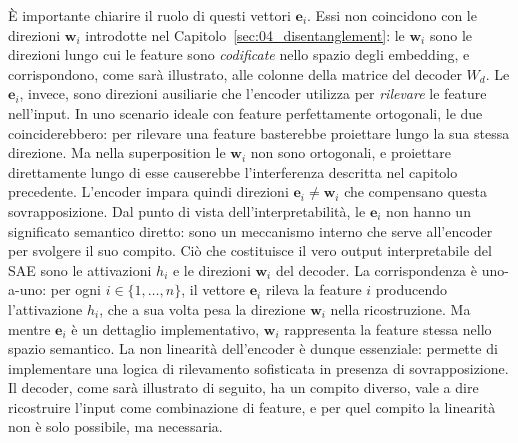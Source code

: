 È importante chiarire il ruolo di questi vettori $\mathbf{e}_i$. Essi non coincidono con le direzioni $\mathbf{w}_i$ introdotte nel Capitolo~\ref{sec:04_disentanglement}: le $\mathbf{w}_i$ sono le direzioni lungo cui le feature sono \textit{codificate} nello spazio degli embedding, e corrispondono, come sarà illustrato, alle colonne della matrice del decoder $W_d$. Le $\mathbf{e}_i$, invece, sono direzioni ausiliarie che l'encoder utilizza per \textit{rilevare} le feature nell'input. In uno scenario ideale con feature perfettamente ortogonali, le due coinciderebbero: per rilevare una feature basterebbe proiettare lungo la sua stessa direzione. Ma nella superposition le $\mathbf{w}_i$ non sono ortogonali, e proiettare direttamente lungo di esse causerebbe l'interferenza descritta nel capitolo precedente. L'encoder impara quindi direzioni $\mathbf{e}_i \neq \mathbf{w}_i$ che compensano questa sovrapposizione.
Dal punto di vista dell'interpretabilità, le $\mathbf{e}_i$ non hanno un significato semantico diretto: sono un meccanismo interno che serve all'encoder per svolgere il suo compito. Ciò che costituisce il vero output interpretabile del SAE sono le attivazioni $h_i$ e le direzioni $\mathbf{w}_i$ del decoder. La corrispondenza è uno-a-uno: per ogni $i \in \{1, \dots, n\}$, il vettore $\mathbf{e}_i$ rileva la feature $i$ producendo l'attivazione $h_i$, che a sua volta pesa la direzione $\mathbf{w}_i$ nella ricostruzione. Ma mentre $\mathbf{e}_i$ è un dettaglio implementativo, $\mathbf{w}_i$ rappresenta la feature stessa nello spazio semantico.
La non linearità dell'encoder è dunque essenziale: permette di implementare una logica di rilevamento sofisticata in presenza di sovrapposizione. Il decoder, come sarà illustrato di seguito, ha un compito diverso, vale a dire ricostruire l'input come combinazione di feature, e per quel compito la linearità non è solo possibile, ma necessaria.

